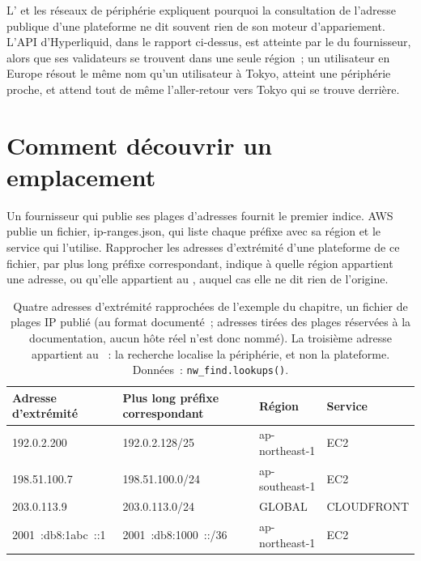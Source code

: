 L' et les réseaux de périphérie expliquent pourquoi la consultation de l'adresse publique d'une plateforme ne dit souvent rien de son moteur d'appariement. L'API d'Hyperliquid, dans le
rapport ci-dessus, est atteinte par le  du fournisseur, alors que ses validateurs se trouvent dans une seule région~; un utilisateur en Europe résout le même nom
qu'un utilisateur à Tokyo, atteint une périphérie proche, et attend tout de même l'aller-retour vers Tokyo qui se trouve derrière.

\section{Comment découvrir un emplacement}

Un fournisseur qui publie ses plages d'adresses fournit le premier indice. AWS publie un fichier, ip-ranges.json, qui liste chaque préfixe avec sa région et
le service qui l'utilise. Rapprocher les adresses d'extrémité d'une plateforme de ce fichier, par plus long préfixe correspondant, indique à quelle région appartient une adresse, ou
qu'elle appartient au , auquel cas elle ne dit rien de l'origine.

\label{lst:nw:where-the-crypto-venues-live:match}

\begin{table}[ht]
\centering\small
\begin{tabular}{llll}
\toprule
Adresse d'extrémité & Plus long préfixe correspondant & Région & Service \\
\midrule
192.0.2.200 & 192.0.2.128/25 & ap-northeast-1 & EC2 \\
198.51.100.7 & 198.51.100.0/24 & ap-southeast-1 & EC2 \\
203.0.113.9 & 203.0.113.0/24 & GLOBAL & CLOUDFRONT \\
2001~:db8:1abc~::1 & 2001~:db8:1000~::/36 & ap-northeast-1 & EC2 \\
\bottomrule
\end{tabular}
\caption{Quatre adresses d'extrémité rapprochées de l'exemple du chapitre, un fichier de plages IP publié (au format documenté~; adresses tirées des
plages réservées à la documentation, aucun hôte réel n'est donc nommé). La troisième adresse appartient au ~: la recherche
localise la périphérie, et non la plateforme. Données~: \texttt{nw\_find.lookups()}.}\label{tab:nw:where-the-crypto-venues-live:lookups}
\end{table}

